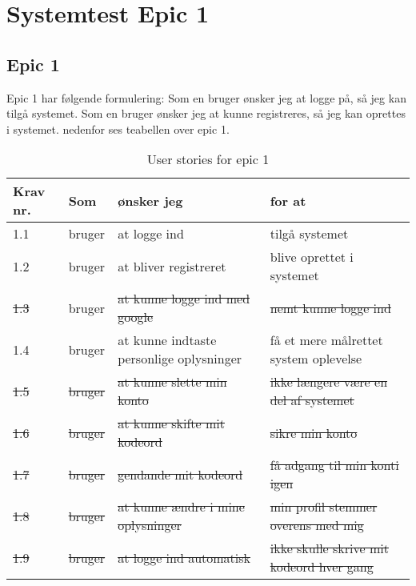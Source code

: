 \chapter{Systemtest Epic 1}
\section{Epic 1}
Epic 1 har følgende formulering: 
Som en bruger ønsker jeg at logge på, så jeg kan tilgå systemet.
Som en bruger ønsker jeg at kunne registreres, så jeg kan oprettes i systemet.
nedenfor ses teabellen over epic 1.

\begin{table}[H]
    \centering
    \caption{User stories for epic 1}
    \label{tab:us-epic1}
    \begin{tabular}{p{1cm}|p{2cm}|p{6cm}|p{6cm}}
        \textbf{Krav nr.} & \textbf{Som} & \textbf{ønsker jeg}                      & \textbf{for at}                          \\
        \hline
        1.1               & bruger       & at logge ind                             & tilgå systemet                           \\
        \hline
        1.2               & bruger       & at bliver registreret                    & blive oprettet i systemet                \\
        \hline
        \sout{1.3}        & bruger       & \sout{at kunne logge ind med google}            & \sout{nemt kunne logge ind}        \\
        \hline
        1.4               & bruger       & at kunne indtaste personlige oplysninger & få et mere målrettet system oplevelse    \\
		\hline
     	\sout{1.5}        & \sout{bruger}       & \sout{at kunne slette min konto}  & \sout{ikke længere være en del af systemet}  \\ 
        \hline
		\sout{1.6}        & \sout{bruger}        & \sout{at kunne skifte mit kodeord}              & \sout{sikre min konto}           \\
        \hline
        \sout{1.7}        & \sout{bruger}        & \sout{gendande mit kodeord}                     & \sout{få adgang til min konti igen}             \\
        \hline
        \sout{1.8}        & \sout{bruger}        & \sout{at kunne ændre i mine oplysninger}        & \sout{min profil stemmer overens med mig}       \\
        \hline
        \sout{1.9}        & \sout{bruger}        & \sout{at logge ind automatisk}           & \sout{ikke skulle skrive mit kodeord hver gang} \\
    \end{tabular}
\end{table}



